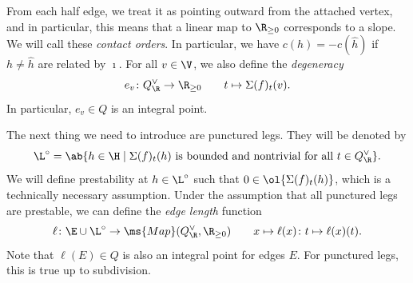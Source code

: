 From each half edge, we treat it as pointing outward from the attached vertex, and in particular, this means that a linear map to \(\R_{\geq 0}\) corresponds to a slope. We will call these \textit{contact orders}. In particular, we have \(c(h) = - c(\hat{h})\) if \(h \neq \hat{h}\) are related by \(\imath\). For all \(v \in \V\), we also define the \textit{degeneracy}
\[ e_v \colon Q_{\R}^{\vee} \to \R_{\geq 0} \qquad t \mapsto \Sigma(f)_t (v). \]
In particular, \(e_v \in Q\) is an integral point.

The next thing we need to introduce are punctured legs. They will be denoted by
\[ \L^{\circ} = \ab\{ h \in \H \mid \Sigma(f)_t(h) \text{ is bounded and nontrivial for all } t \in Q_{\R}^{\vee}\}. \] 
We will define prestability at \(h \in \L^{\circ}\) such that \(0 \in \ol{\Sigma(f)_t(h)}\), which is a technically necessary assumption. Under the assumption that all punctured legs are prestable, we can define the \textit{edge length} function
\[ \ell \colon \E \cup \L^{\circ} \to \ms{Map}(Q_{\R}^{\vee}, \R_{\geq 0}) \qquad x \mapsto \ell(x) \colon t \mapsto \ell(x)(t). \]
Note that \(\ell(E) \in Q\) is also an integral point for edges \(E\). For punctured legs, this is true up to subdivision.

